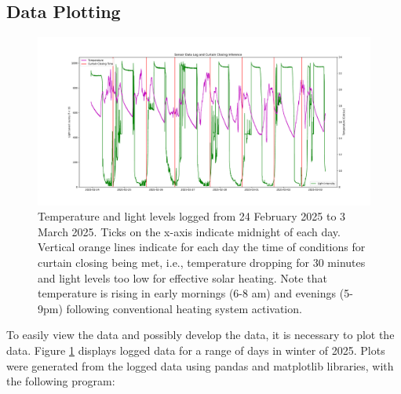 \documentclass[a4paper,12pt]{article}
\begin{document}
\subsection{Data Plotting}

\begin{figure}[h!]
    \includegraphics[width=\linewidth]{./figures/logDataPlot.pdf}
    \caption{Temperature and light levels logged from 24 February 2025 to 3 March 2025. Ticks on the x-axis indicate midnight of each day.
    Vertical orange lines indicate for each day the time of conditions for 
    curtain closing being met, i.e., temperature dropping for 30 minutes and light levels too low for effective solar heating. Note that temperature 
    is rising in early mornings (6-8 am) and evenings (5-9pm) following conventional heating system activation. }  
    \label{fig:plot1}
  \end{figure}

To easily view the data and possibly develop the data, it is necessary to plot the data. 
Figure \ref{fig:plot1} displays logged data for a range of days in winter of 2025.
Plots were generated from the logged data using pandas and matplotlib libraries, with the following program:
\end{document}

